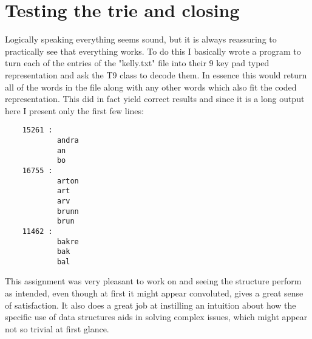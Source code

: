 \documentclass[a4paper,11pt]{article}
\begin{document}
\section*{Testing the trie and closing}

Logically speaking everything seems sound, but it is always reassuring to practically see that everything works. To do this I basically wrote a program to turn each of the entries of the "kelly.txt" file into their 9 key pad typed representation and ask the T9 class to decode them. In essence this would return all of the words in the file along with any other words which also fit the coded representation. This did in fact yield correct results and since it is a long output here I present only the first few lines:

\begin{verbatim}
    15261 : 
            andra
            an
            bo
    16755 : 
            arton
            art
            arv
            brunn
            brun
    11462 : 
            bakre
            bak
            bal
\end{verbatim}

This assignment was very pleasant to work on and seeing the structure perform as intended, even though at first it might appear convoluted, gives a great sense of satisfaction. It also does a great job at instilling an intuition about how the specific use of data structures aids in solving complex issues, which might appear not so trivial at first glance.
\end{document}
